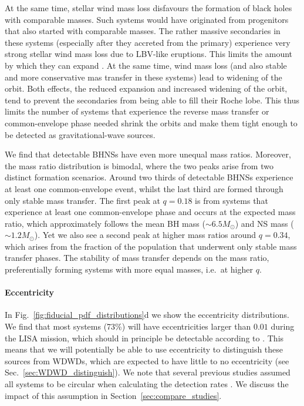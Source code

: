 At the same time, stellar wind mass loss disfavours the formation of black holes with comparable masses. Such systems would have originated from progenitors that also started with comparable masses. The rather massive secondaries in these systems (especially after they accreted from the primary) experience very strong stellar wind mass loss due to LBV-like eruptions. This limits the amount by which they can expand \citep[e.g.][]{vanSon+2021}. At the same time, wind mass loss (and also stable and more conservative mas transfer in these systems) lead to widening of the orbit. Both effects, the reduced expansion and increased widening of the orbit, tend to prevent the secondaries from being able to fill their Roche lobe. This thus limits the number of systems that experience the reverse mass transfer or common-envelope phase needed shrink the orbits and make them tight enough to be detected as gravitational-wave sources.

We find that detectable BHNSs have even more unequal mass ratios. Moreover, the mass ratio distribution is bimodal, where the two peaks arise from two distinct formation scenarios. Around two thirds of detectable BHNSs experience at least one common-envelope event, whilst the last third are formed through only stable mass transfer. The first peak at $q = 0.18$ is from systems that experience at least one common-envelope phase and occurs at the expected mass ratio, which approximately follows the mean BH mass ($\sim 6.5 \unit{M_\odot}$) and NS mass ($\sim 1.2 \unit{M_\odot}$). Yet we also see a second peak at higher mass ratios around $q = 0.34$, which arises from the fraction of the population that underwent only stable mass transfer phases. The stability of mass transfer depends on the mass ratio, preferentially forming systems with more equal masses, i.e.\ at higher $q$.

\paragraph{Eccentricity} In Fig.~\ref{fig:fiducial_pdf_distributions}d we show the eccentricity distributions. We find that most systems (73\%) will have eccentricities larger than $0.01$ during the LISA mission, which should in principle be detectable according to \citet{Nishizawa+2016}. This means that we will potentially be able to use eccentricity to distinguish these sources from WDWDs, which are expected to have little to no eccentricity (see Sec.~\ref{sec:WDWD_distinguish}). We note that several previous studies assumed all systems to be circular when calculating the detection rates \citep[e.g.][]{Liu+2014, Lamberts+2018, Sesana+2020}. We discuss the impact of this assumption in Section~\ref{sec:compare_studies}.

